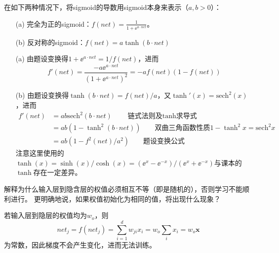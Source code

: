 \documentclass[reportComp]{thesis}
\def\sech{\mathrm{sech}}
\begin{document}
\begin{question}[\textsection 6 Q10]
在如下两种情况下，将sigmoid的导数用sigmoid本身来表示（$a,b>0$）：
\begin{itemize}
	\item [(a)] 完全为正的sigmoid：$f(net)=\frac{1}{1+\ee^{a\cdot net}}$。
	\item [(b)] 反对称的sigmoid：$f(net)=a\tanh(b\cdot net)$
\end{itemize}
\end{question}
\begin{answer}
\begin{itemize}
	\item [(a)] 由题设变换得$1+\ee^{a\cdot net}=1/f(net)$，进而
	\[f'(net)=\frac{-a\ee^{a\cdot net}}{(1+\ee^{a\cdot net})^2}=-af(net)(1-f(net))\]
	\item [(b)] 由题设变换得$\tanh(b\cdot net)=f(net)/a$，又$\tanh'(x)=\sech^2(x)$，进而
	\[\begin{aligned}
	f'(net)&=ab\sech^2(b\cdot net)\qquad\text{链式法则及$\tanh$求导式}\\
	&=ab(1-\tanh^2(b\cdot net))\qquad\text{双曲三角函数性质}1-\tanh^2 x=\sech^2x\\
	&=ab(1-f^2(net)/a^2)\qquad\text{题设变换公式}
	\end{aligned}\]
	注意这里使用的$\tanh(x)=\sinh(x)/\cosh(x)=(\ee^{x}-\ee^{-x})/(\ee^{x}+\ee^{-x})$与课本的$\tanh$存在一定差异。
\end{itemize}
\end{answer}

\begin{question}[\textsection 6 Q12]
解释为什么输入层到隐含层的权值必须相互不等（即是随机的），否则学习不能顺利进行。
更明确地说，如果权值初始化为相同的值，将出现什么现象？
\end{question}
\begin{answer}
若输入层到隐层的权值均为$w_o$，则
\[net_{j}=f\left(net_{j}\right)=\sum_{i=1}^{d} w_{ji} x_{i}=w_{o} \sum_{i} x_{i}=w_{o} \mathbf{x}\]
为常数，因此梯度不会产生变化，进而无法训练。
\end{answer}
\end{document}
